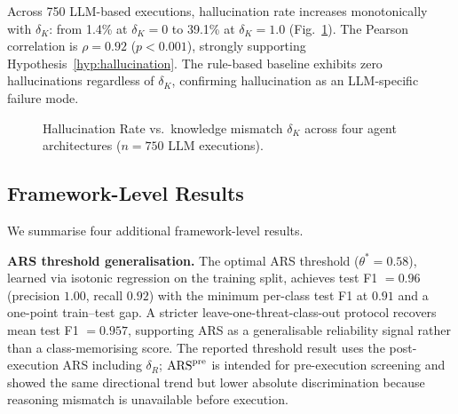 Across 750 LLM-based executions, hallucination rate increases monotonically
with $\delta_K$: from 1.4\% at $\delta_K = 0$ to 39.1\% at $\delta_K = 1.0$
(Fig.~\ref{fig:e1_isaia}). The Pearson correlation is $\rho = 0.92$
($p < 0.001$), strongly supporting Hypothesis~\ref{hyp:hallucination}. The
rule-based baseline exhibits zero hallucinations regardless of $\delta_K$,
confirming hallucination as an LLM-specific failure mode.

\begin{figure}[t]
\centering
{}
\caption{Hallucination Rate vs.\ knowledge mismatch $\delta_K$ across
four agent architectures ($n = 750$ LLM executions).}
\label{fig:e1_isaia}
\end{figure}

\subsection{Framework-Level Results}

We summarise four additional framework-level results.

\textbf{ARS threshold generalisation.} The optimal ARS threshold
($\theta^* = 0.58$), learned via isotonic regression on the training
split, achieves test F1 $= 0.96$ (precision $1.00$, recall $0.92$)
with the minimum per-class test F1 at $0.91$ and a one-point
train--test gap. A stricter leave-one-threat-class-out protocol
recovers mean test F1 $= 0.957$, supporting ARS as a generalisable
reliability signal rather than a class-memorising score.
The reported threshold result uses the post-execution ARS including
$\delta_R$; $\mathrm{ARS}^{\mathrm{pre}}$ is intended for pre-execution
screening and showed the same directional trend but lower absolute
discrimination because reasoning mismatch is unavailable before
execution.

